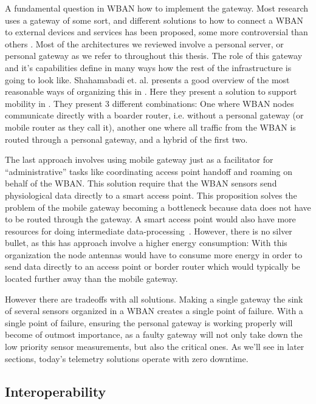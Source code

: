 A fundamental question in WBAN how to implement the gateway. Most research uses a gateway of some sort, and different solutions to how to connect a WBAN to external devices and services has been proposed\cite{Shahamabadi:2013df}, some more controversial than others \cite{Zachariah:2015cm}. Most of the architectures we reviewed involve a personal server, or personal gateway as we refer to throughout this thesis. The role of this gateway and it's capabilities define in many ways how the rest of the infrastructure is going to look like. Shahamabadi et. al. presents a good overview of the most reasonable ways of organizing this in \cite{Shahamabadi:2013df}. Here they present a solution to support mobility in . They present 3 different combinations: One where WBAN nodes communicate directly with a boarder router, i.e. without a personal gateway (or mobile router as they call it), another one where all traffic from the WBAN is routed through a personal gateway, and a hybrid of the first two.

The last approach involves using mobile gateway just as a facilitator for ``administrative'' tasks like coordinating access point handoff and roaming on behalf of the WBAN. This solution require that the WBAN sensors send physiological data directly to a smart access point. This proposition solves the problem of the mobile gateway becoming a bottleneck because data does not have to be routed through the gateway. A smart access point would also have more resources for doing intermediate data-processing~\cite{DrAmirMohammadRahmani:2014vx}. However, there is no silver bullet, as this has approach involve a higher energy consumption: With this organization the node antennas would have to consume more energy in order to send data directly to an access point or border router which would typically be located further away than the mobile gateway. 

However there are tradeoffs with all solutions. Making a single gateway the sink of several sensors organized in a WBAN creates a single point of failure. With a single point of failure, ensuring the personal gateway is working properly will become of outmost importance, as a faulty gateway will not only take down the low priority sensor measurements, but also the critical ones. As we'll see in later sections, today's telemetry solutions operate with zero downtime.


\subsection{Interoperability} %
\label{sub:interoperability}

